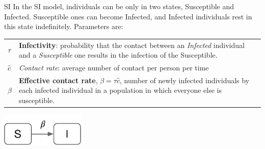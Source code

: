 \documentclass[a4paper,11pt]{book}
\begin{document}
\begin{textbox}{SI}
In the SI model, individuals can be only in two states, Susceptible and Infected. Susceptible ones can become Infected, and Infected individuals rest in this state indefinitely. Parameters are:

\begin{tabular}{p{}|p{}}\scriptsize

$\tau$ & \textbf{Infectivity}: probability that the contact between an \textit{Infected} individual and a \textit{Susceptible} one results in the infection of the Susceptible. \\
$\hat{c}$ & \textit{Contact rate}: average number of contact per person per time \\
$\beta$ & \textbf{Effective contact rate}, $\beta=\tau\hat{c}$, number of newly infected individuals by each infected individual in a population in which everyone else is susceptible. 
\end{tabular}


\centering
\vspace{0.3cm}
\includegraphics[width=0.3\textwidth]{pics/SI.pdf}
\end{textbox}
\end{document}
